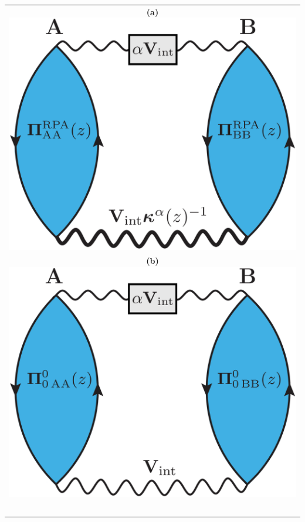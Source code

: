 \documentclass{standalone}
\begin{document}

\begin{tabular}{ c }
  \Huge\bf{(a)} \includegraphics[scale=0.23]{int_gold.eps}  \\
  \Huge\bf{(b)} \includegraphics[scale=0.23]{int_gold2.eps} \\
  \
\end{tabular}
\end{document}
